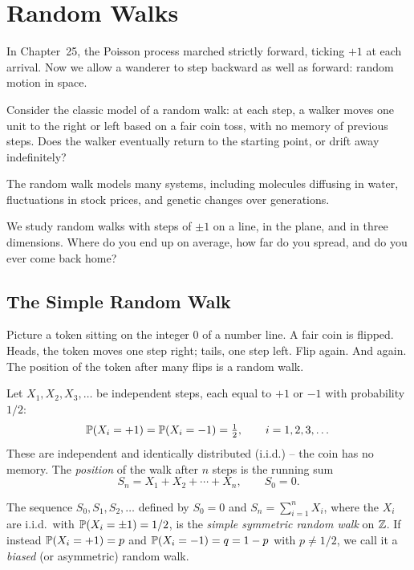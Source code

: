 \chapter{Random Walks}

In Chapter~25, the Poisson process marched strictly forward, ticking $+1$ at each arrival.
Now we allow a wanderer to step backward as well as forward: random motion in space.

Consider the classic model of a random walk: at each step, a walker moves
one unit to the right or left based on a fair coin toss, with no memory of previous steps.
Does the walker eventually return to the starting point, or drift away indefinitely?

The random walk models many systems, including molecules diffusing in water, fluctuations in stock prices, and genetic changes over generations.

We study random walks with steps of $\pm 1$ on
a line, in the plane, and in three dimensions. Where do you end up on average,
how far do you spread, and do you ever come back home?

\chapterline

\section{The Simple Random Walk}
\label{ch26:srw}

\begin{intuitionbox}
Picture a token sitting on the integer $0$
of a number line. A fair coin is flipped. Heads, the token moves one step
right; tails, one step left. Flip again. And again. The position of the token
after many flips is a random walk.
\end{intuitionbox}

Let $X_1, X_2, X_3, \dots$ be independent steps, each equal to $+1$ or $-1$
with probability $1/2$:
\[
  \P(X_i = +1) = \P(X_i = -1) = \tfrac{1}{2}, \qquad i = 1, 2, 3, \dots
\]
These are independent and identically distributed (i.i.d.) -- the coin has no
memory. The \emph{position} of the walk after $n$ steps is the running sum
\[
  S_n = X_1 + X_2 + \cdots + X_n, \qquad S_0 = 0.
\]

\begin{definition}
\label{ch26:def-srw}
The sequence $S_0, S_1, S_2, \dots$ defined by $S_0 = 0$ and
$S_n = \sum_{i=1}^n X_i$, where the $X_i$ are i.i.d.\ with
$\P(X_i = \pm 1) = 1/2$, is the \emph{simple symmetric random walk} on $\Z$.
If instead $\P(X_i = +1) = p$ and $\P(X_i = -1) = q = 1-p$ with $p \neq 1/2$,
we call it a \emph{biased} (or asymmetric) random walk.
\end{definition}

